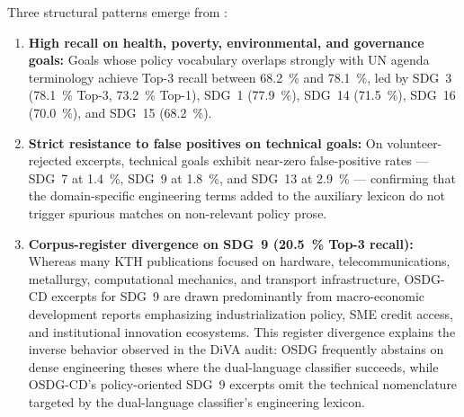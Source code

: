 \FloatBarrier
Three structural patterns emerge from :
\begin{enumerate}
  \item \textbf{High recall on health, poverty, environmental, and governance goals:} Goals whose policy vocabulary overlaps strongly with \gls{UN} agenda terminology achieve Top-3 recall between \SI{68.2}{\percent} and \SI{78.1}{\percent}, led by \gls{SDG}~3 (\SI{78.1}{\percent} Top-3, \qty{73.2}{\percent} Top-1), \gls{SDG}~1 (\qty{77.9}{\percent}), \gls{SDG}~14 (\qty{71.5}{\percent}), \gls{SDG}~16 (\qty{70.0}{\percent}), and \gls{SDG}~15 (\qty{68.2}{\percent}).
  
  \item \textbf{Strict resistance to false positives on technical goals:} On volunteer-rejected excerpts, technical goals exhibit near-zero false-positive rates --- \gls{SDG}~7 at \qty{1.4}{\percent}, \gls{SDG}~9 at \qty{1.8}{\percent}, and \gls{SDG}~13 at \qty{2.9}{\percent} --- confirming that the domain-specific engineering terms added to the auxiliary lexicon do not trigger spurious matches on non-relevant policy prose.
  
  \item \textbf{Corpus-register divergence on \gls{SDG}~9 (\qty{20.5}{\percent} Top-3 recall):} Whereas many KTH publications focused on hardware, telecommunications, metallurgy, computational mechanics, and transport infrastructure, OSDG-CD excerpts for \gls{SDG}~9 are drawn predominantly from macro-economic development reports emphasizing industrialization policy, \gls{SME} credit access, and institutional innovation ecosystems. This register divergence explains the inverse behavior observed in the \gls{DiVA} audit: OSDG frequently abstains on dense engineering theses where the dual-language classifier succeeds, while OSDG-CD's policy-oriented \gls{SDG}~9 excerpts omit the technical nomenclature targeted by the dual-language classifier's engineering lexicon.
\end{enumerate}

